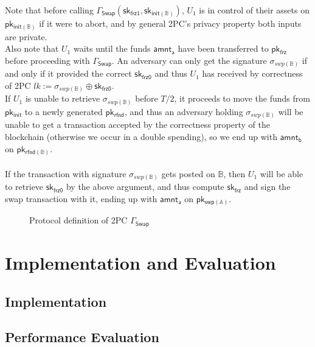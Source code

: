 \documentclass{article}      	%
\begin{document}
Note that before calling $\Gamma_{\mathsf{Swap}}(\mathsf{sk_{frz1}}, \mathsf{sk_{init(\mathbb{B})}})$, $U_1$ is in control of their assets on $\mathsf{pk_{init(\mathbb{B})}}$ if it were to abort, and by general 2PC's privacy property both inputs are private. \\
Also note that $U_1$ waits until the funds $\mathsf{amnt_a}$ have been transferred to $\mathsf{pk_{frz}}$ before proceeding with  $\Gamma_{\mathsf{Swap}}$.
An adversary can only get the signature $\sigma_{swp(\mathbb{B})}$ if and only if it provided the correct $\mathsf{sk_{frz0}}$ and thus $U_1$ has received by correctness of 2PC $lk := \sigma_{swp(\mathbb{B})} \oplus \mathsf{sk_{frz0}}$. \\
If $U_1$ is unable to retrieve $\sigma_{swp(\mathbb{B})}$ before $T/2$, it proceeds to move the funds from $\mathsf{pk_{init}}$ to a newly generated $\mathsf{pk_{rfnd}}$, and thus an adversary holding $\sigma_{swp(\mathbb{B})}$ will be unable to get a transaction accepted by the correctness property of the blockchain (otherwise we occur in a double spending), so we end up with  $\mathsf{amnt_b}$ on $\mathsf{pk_{rfnd(\mathbb{B})}}$. \\
\\
If the transaction with signature $\sigma_{swp(\mathbb{B})}$ gets posted on $\mathbb{B}$, then $U_1$ will be able to retrieve $\mathsf{sk_{frz0}}$ by the above argument, and thus compute $\mathsf{sk_{frz}}$ and sign the swap transaction with it, ending up with $\mathsf{amnt_a}$ on $\mathsf{pk_{swp(\mathbb{A})}}$.

\newpage
\begin{figure}[H]
\begin{pchstack}

\end{pchstack}
\caption{Protocol definition of 2PC $\Gamma_{\mathsf{Swap}}$}
\end{figure}

\section{Implementation and Evaluation}

\subsection{Implementation}


\subsection{Performance Evaluation}

\end{document}
